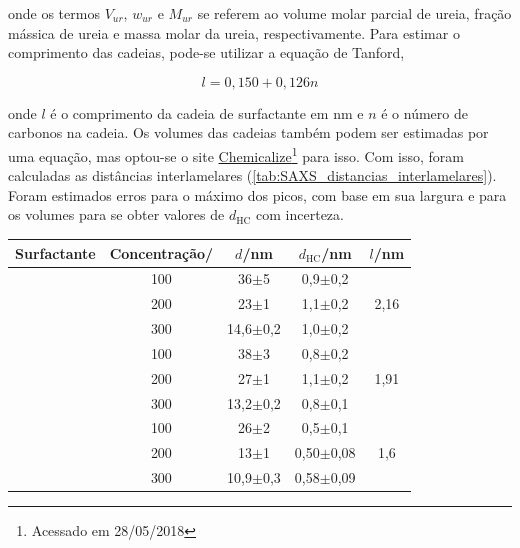 	\noindent onde os termos \(V_{\textit{ur}}\), \(w_{\textit{ur}}\) e \(M_{\textit{ur}}\)	se referem ao volume molar parcial de ureia, fração mássica de ureia e massa molar da ureia, respectivamente. Para estimar o comprimento das cadeias, pode-se utilizar a equação de Tanford,\cite{Israelachvili2011}
	
	\begin{equation}
		l = 0{,}150 + 0{,}126n
		\label{eqn:tanford}
	\end{equation}
	
	\noindent onde \(l\) é o comprimento da cadeia de surfactante em nm e \(n\) é o número de carbonos na cadeia. Os volumes das cadeias também podem ser estimadas por uma equação, mas optou-se o site \href{www.chemicalize.com}{Chemicalize}\footnote{Acessado em 28/05/2018} para isso. Com isso, foram calculadas as distâncias interlamelares (\autoref{tab:SAXS_distancias_interlamelares}). Foram estimados erros para o máximo dos picos, com base em sua largura e para os volumes para se obter valores de \(d_\mathrm{HC}\) com incerteza.
	
		\begin{table}[H]
		{%
		\begin{tabular}{c c c c c}
			\toprule
			   Surfactante  & Concentração/\mM     & $d$/nm       & \(d_\mathrm{HC}\)/nm & \(l\)/nm               \\ \midrule
			\multirow{3}{*}{\CTAB} & 100              & 36$\pm$5     & 0,9$\pm$0,2          & \multirow{3}{*}{2,16}  \\
			                      & 200              & 23$\pm$1     & 1,1$\pm$0,2          &                        \\
			                      & 300              & 14,6$\pm$0,2 & 1,0$\pm$0,2          &                        \\ \midrule
			\multirow{3}{*}{\TTAB} & 100              & 38$\pm$3     & 0,8$\pm$0,2          & \multirow{3}{*}{1,91}  \\
			                      & 200              & 27$\pm$1     & 1,1$\pm$0,2          &                        \\
			                      & 300              & 13,2$\pm$0,2 & 0,8$\pm$0,1          &                        \\ \midrule
			\multirow{3}{*}{\DTAB} & 100              & 26$\pm$2     & 0,5$\pm$0,1          & \multirow{3}{*}{1,6}   \\
			                      & 200              & 13$\pm$1     & 0,50$\pm$0,08        &                        \\
			                      & 300              & 10,9$\pm$0,3 & 0,58$\pm$0,09        &                        \\ \bottomrule
		\end{tabular}
	}{}
	\end{table} 
	
